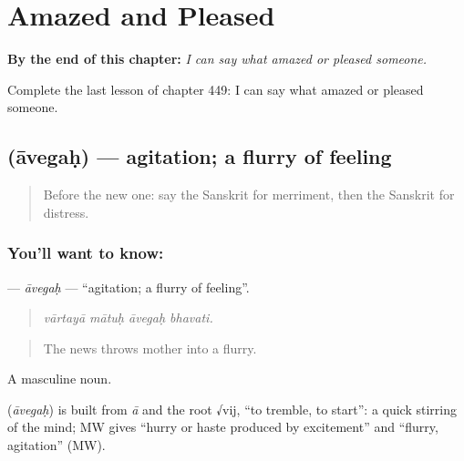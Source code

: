 
\chapter{Amazed and Pleased}
\label{ch:sa-amazed-and-pleased}

\begin{chapteropening}
\textbf{By the end of this chapter:} \emph{I can say what amazed or pleased someone.}

Complete the last lesson of chapter 449: I can say what amazed or pleased someone.
\end{chapteropening}

\section[\texorpdfstring{\sk{आवेगः} (āvegaḥ)}{आवेगः (āvegaḥ)}]{ (āvegaḥ) — agitation; a flurry of feeling}

\label{lesson:SA-C449-avegah}



\begin{quote}
Before the new one: say the Sanskrit for merriment, then the Sanskrit for distress.
\end{quote}

\subsection*{You'll want to know: }
\textbf{} — \emph{āvegaḥ} — \textquotedblleft{}agitation; a flurry of feeling\textquotedblright{}.

\begin{quote}
   
\end{quote}

\begin{quote}
\emph{vārtayā mātuḥ āvegaḥ bhavati.}
\end{quote}

\begin{quote}
The news throws mother into a flurry.
\end{quote}

A masculine noun.

\begin{cousinweb}
\textbf{} (\emph{āvegaḥ}) is built from \emph{ā} and the root √vij, \textquotedblleft{}to tremble, to start\textquotedblright{}: a quick stirring of the mind; MW gives \textquotedblleft{}hurry or haste produced by excitement\textquotedblright{} and \textquotedblleft{}flurry, agitation\textquotedblright{} (MW).
\end{cousinweb}

